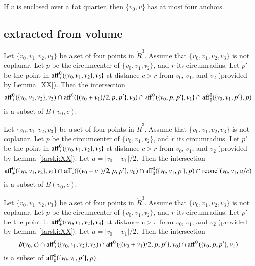 \begin{lemma}
If $v$ is enclosed over a flat quarter, then $\{v_0,v\}$ has at most four
anchors.
\end{lemma}


\newpage


\subsection{extracted from volume}

\begin{lemma}
Let $\{v_0,v_1,v_2,v_3\}$ be a set of four points in $\ring{R}^3$.
Assume that $\{v_0,v_1,v_2,v_3\}$ is not coplanar.  Let $p$
be the circumcenter of $\{v_0,v_1,v_2\}$, and $r$ its circumradius.  
Let $p'$ be the
point in ${\operatorname{aff}}_+^0(\{v_0,v_1,v_2\},v_3\}$ at distance
$c > r$ from $v_0$, $v_1$, and $v_2$ (provided by Lemma~\ref{XX}). %
Then the intersection
  $$
  {\operatorname{aff}}^0_+(\{v_0,v_1,v_2\},v_3) \cap
  {\operatorname{aff}}^0_+(\{(v_0+v_1)/2,p,p' \},v_0) \cap
  {\operatorname{aff}}^0_+(\{v_0,p,p'\},v_1\}\cap
  {\operatorname{aff}}^0_0(\{v_0,v_1,p'\},p)
  $$
is a subset of $B(v_0,c)$.
\end{lemma}

\newpage

\begin{lemma}
Let $\{v_0,v_1,v_2,v_3\}$ be a set of four points in $\ring{R}^3$.
Assume that $\{v_0,v_1,v_2,v_3\}$ is not coplanar.  Let $p$
be the circumcenter of $\{v_0,v_1,v_2\}$, and $r$ its circumradius.  
Let $p'$ be the
point in ${\operatorname{aff}}_+^0(\{v_0,v_1,v_2\},v_3\}$ at distance
$c > r$ from $v_0$, $v_1$, and $v_2$ (provided by Lemma~\ref{tarski:XX}).
Let $a = |v_0-v_1|/2$.
Then the intersection
  $$
  {\operatorname{aff}}^0_+(\{v_0,v_1,v_2\},v_3) \cap
  {\operatorname{aff}}^0_+(\{(v_0+v_1)/2,p,p' \},v_0) \cap
  {\operatorname{aff}}^0_0(\{v_0,v_1,p'\},p)\cap
  {\operatorname{rcone}}^0(v_0,v_1,a/c)
  $$
is a subset of $B(v_0,c)$.
\end{lemma}


\newpage

\begin{lemma}
Let $\{v_0,v_1,v_2,v_3\}$ be a set of four points in $\ring{R}^3$.
Assume that $\{v_0,v_1,v_2,v_3\}$ is not coplanar.  Let $p$
be the circumcenter of $\{v_0,v_1,v_2\}$, and $r$ its circumradius.  
Let $p'$ be the
point in ${\operatorname{aff}}_+^0(\{v_0,v_1,v_2\},v_3\}$ at distance
$c > r$ from $v_0$, $v_1$, and $v_2$ (provided by Lemma~\ref{tarski:XX}).
Let $a = |v_0-v_1|/2$.
Then the intersection
  $$
  B(v_0,c)\cap
  {\operatorname{aff}}^0_+(\{v_0,v_1,v_2\},v_3) \cap
  {\operatorname{aff}}^0_-(\{(v_0+v_1)/2,p,p' \},v_0) \cap
  {\operatorname{aff}}^0_-(\{v_0,p,p'\},v_1)
  $$
is a subset of ${\operatorname{aff}}^0_0(\{v_0,v_1,p'\},p)$.
\end{lemma}


